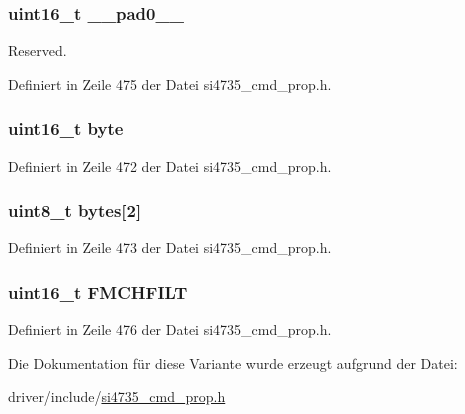 \subsubsection[{\+\_\+\+\_\+pad0\+\_\+\+\_\+}]{\setlength{\rightskip}{0pt plus 5cm}uint16\+\_\+t \+\_\+\+\_\+pad0\+\_\+\+\_\+}\label{unionfm__channel__filter_a77132c2c26a75f5b8751b235cda23828}


Reserved. 



Definiert in Zeile 475 der Datei si4735\+\_\+cmd\+\_\+prop.\+h.

\hypertarget{unionfm__channel__filter_ab0549c1b5ea980a02e7eab77e21fea49}{}
\subsubsection[{byte}]{\setlength{\rightskip}{0pt plus 5cm}uint16\+\_\+t byte}\label{unionfm__channel__filter_ab0549c1b5ea980a02e7eab77e21fea49}


Definiert in Zeile 472 der Datei si4735\+\_\+cmd\+\_\+prop.\+h.

\hypertarget{unionfm__channel__filter_a46e4c05d20a047ec169f60d3167e912e}{}
\subsubsection[{bytes}]{\setlength{\rightskip}{0pt plus 5cm}uint8\+\_\+t bytes\mbox{[}2\mbox{]}}\label{unionfm__channel__filter_a46e4c05d20a047ec169f60d3167e912e}


Definiert in Zeile 473 der Datei si4735\+\_\+cmd\+\_\+prop.\+h.

\hypertarget{unionfm__channel__filter_a584b5186edaab50c1b4bbc2fea4d0a3b}{}
\subsubsection[{F\+M\+C\+H\+F\+I\+L\+T}]{\setlength{\rightskip}{0pt plus 5cm}uint16\+\_\+t F\+M\+C\+H\+F\+I\+L\+T}\label{unionfm__channel__filter_a584b5186edaab50c1b4bbc2fea4d0a3b}


Definiert in Zeile 476 der Datei si4735\+\_\+cmd\+\_\+prop.\+h.



Die Dokumentation für diese Variante wurde erzeugt aufgrund der Datei\+:\begin{DoxyCompactItemize}
\item 
driver/include/\hyperlink{si4735__cmd__prop_8h}{si4735\+\_\+cmd\+\_\+prop.\+h}\end{DoxyCompactItemize}

